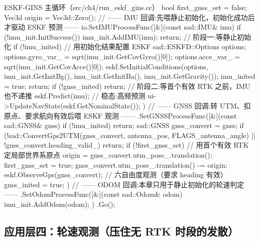 \begin{codebox}[C++]{ESKF-GINS 主循环（src/ch4/run\_eskf\_gins.cc）}
bool first_gnss_set = false; Vec3d origin = Vec3d::Zero();
// —— IMU 回调:先喂静止初始化，初始化成功后才驱动 ESKF 预测 ——
io.SetIMUProcessFunc([&](const sad::IMU& imu) {
    if (!imu_init.InitSuccess()) { imu_init.AddIMU(imu); return; }   // 阶段一:等静止初始化
    if (!imu_inited) {                                               // 用初始化结果配置 ESKF
      sad::ESKFD::Options options;
      options.gyro_var_ = sqrt(imu_init.GetCovGyro()[0]);
      options.acce_var_ = sqrt(imu_init.GetCovAcce()[0]);
      eskf.SetInitialConditions(options, imu_init.GetInitBg(), imu_init.GetInitBa(),
                                imu_init.GetGravity());
      imu_inited = true; return;
    }
    if (!gnss_inited) return;        // 阶段二:等首个有效 RTK 之前，IMU 也不递推
    eskf.Predict(imu);               // 稳态:高频预测
    ui->UpdateNavState(eskf.GetNominalState());
  })
// —— GNSS 回调:转 UTM、扣原点、要求航向有效后喂 ESKF 观测 ——
  .SetGNSSProcessFunc([&](const sad::GNSS& gnss) {
    if (!imu_inited) return;
    sad::GNSS gnss_convert = gnss;
    if (!sad::ConvertGps2UTM(gnss_convert, antenna_pos, FLAGS_antenna_angle) ||
        !gnss_convert.heading_valid_) return;
    if (!first_gnss_set) {           // 用首个有效 RTK 定局部世界系原点
      origin = gnss_convert.utm_pose_.translation(); first_gnss_set = true;
    }
    gnss_convert.utm_pose_.translation() -= origin;
    eskf.ObserveGps(gnss_convert);   // 六自由度观测（要求 heading 有效）
    gnss_inited = true;
  })
// —— ODOM 回调:本章只用于静止初始化的轮速判定 ——
  .SetOdomProcessFunc([&](const sad::Odom& odom) { imu_init.AddOdom(odom); })
  .Go();
\end{codebox}

\subsection{应用层四：轮速观测（压住无 RTK 时段的发散）}
\label{sec:gins-wheel}

